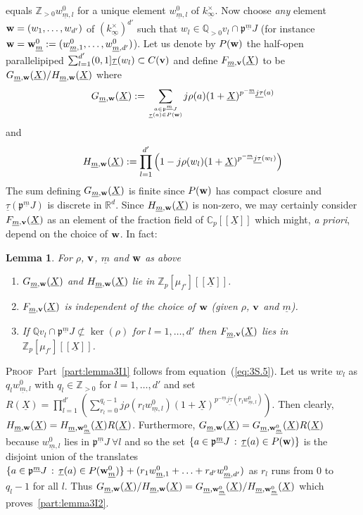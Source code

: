 \documentclass[12pt]{article}
\newtheorem{lemma}{Lemma}[section]
\newcounter{rem}[section]%
\newcommand{\bbC}{\ensuremath{\mathbb{C}}}
\newcommand{\bbQ}{\ensuremath{\mathbb{Q}}}
\newcommand{\bbR}{\ensuremath{\mathbb{R}}}
\newcommand{\bbZ}{\ensuremath{\mathbb{Z}}}
\newcommand{\bPf}{\noindent \textsc{Proof\ }}
\newcommand{\bv}{\ensuremath{{\bf v}}}
\newcommand{\bw}{\ensuremath{{\bf w}}}
\newcommand{\fp}{\ensuremath{\mathfrak{p}}}
\newcommand{\refeq}[1]{~(\ref{eq:#1})}
\newcommand{\rem}{\refstepcounter{rem}\noindent{\sc Remark \therem}}%
\renewcommand{\therem}{\thesection.\arabic{rem}}
\newcommand{\ktuinf}{\ensuremath{k^\times_{\uinf}}}
\newcommand{\uinf}{\ensuremath{{\underline{\infty}}}}
\newcommand{\ujct}{\ensuremath{\underline{j\tau}}}
\newcommand{\um}{\ensuremath{{\underline{m}}}}
\newcommand{\utau}{\ensuremath{{\underline{\tau}}}}
\newcommand{\uX}{\ensuremath{{\underline{X}}}}
\begin{document}
equals $\bbZ_{>0}w^0_{\um,l}$
for a unique element $w^0_{\um,l}$ of $\ktuinf$.
Now choose \emph{any} element $\bw=(w_1,\ldots,w_{d'})$ of
$(\ktuinf)^{d'}$ such that $w_l\in\bbQ_{>0} v_l\cap\fp^\um J$
(for instance $\bw=\bw^0_\um:=(w^0_{\um,1},\ldots,w^0_{\um,d'})$).
Let us denote by $P(\bw)$ the half-open parallelipiped
$\sum_{l=1}^{d'}(0,1]\utau(w_l)\subset C(\bv)$
and define $F_{\um,\bv}(\uX)$ to be $G_{\um,\bw}(\uX)/H_{\um,\bw}(\uX)$ where
\[
G_{\um,\bw}(\uX):=
{\displaystyle \sum_{a\in\fp^{\um} J\atop \utau(a)\in P(\bw)}}
j\rho(a)(1+\uX)^{p^{-\um}\ujct(a)}
\]
and
\[
H_{\um,\bw}(\uX):=
{\displaystyle \prod_{l=1}^{d'}}
\left(
1-j\rho(w_l)(1+\uX)^{p^{-\um}\ujct(w_l)}
\right)
\]
The sum defining $G_{\um,\bw}(\uX)$ is finite since
$P(\bw)$ has compact closure and
$\utau(\fp^{\um} J)$ is discrete in $\bbR^d$.
Since $H_{\um,\bw}(\uX)$ is non-zero, we may certainly consider $F_{\um,\bv}(\uX)$
as an element of the fraction field
of $\bbC_p[[\uX]]$ which might, \emph{a priori}, depend on the choice of $\bw$.
In fact:
\begin{lemma}\label{lemma:3I} For $\rho$, $\bv$, $\um$ and $\bw$ as above
\begin{enumerate}
\item\label{part:lemma3I1} $G_{\um,\bw}(\uX)$ and $H_{\um,\bw}(\uX)$
lie in $\bbZ_p[\mu_{f'}][[\uX]]$.
\item\label{part:lemma3I2} $F_{\um,\bv}(\uX)$ is independent of
the choice of $\bw$ (given $\rho$, $\bv$ and $\um$).
\item\label{part:lemma3I3} If $\bbQ v_l\cap \fp^\um J\not\subset\ker(\rho)$
for $l=1,\ldots,d'$ then $F_{\um,\bv}(\uX)$ lies in $\bbZ_p[\mu_{f'}][[\uX]]$.
\end{enumerate}
\end{lemma}
\bPf Part~\ref{part:lemma3I1} follows from equation\refeq{3S.5}.
Let us write $w_l$ as $q_lw^0_{\um,l}$ with $q_l\in \bbZ_{>0}$ for $l=1,\ldots,d'$
and set $R(\uX)=
\prod_{l=1}^{d'}
\left(\sum_{r_l=0}^{q_l-1}
j\rho(r_lw^0_{\um,l})(1+\uX)^{p^{-\um}\ujct(r_lw^0_{\um,l})}\right)$.
Then clearly, $H_{\um,\bw}(\uX)=H_{\um,\bw^0_{\um}}(\uX)R(\uX)$. Furthermore,
$G_{\um,\bw}(\uX)=G_{\um,\bw^0_{\um}}(\uX)R(\uX)$ because
$w^0_{\um,l}$ lies in $\fp^{\um} J\ \forall l$ and so the set
$\{a\in\fp^{\um} J\,:\,\utau(a)\in P(\bw)\}$
is the disjoint union of the translates
$\{a\in\fp^{\um} J\,:\,\utau(a)\in P(\bw^0_{\um})\}+
(r_1w^0_{\um,1}+\ldots+r_{d'}w^0_{\um,d'})$
as $r_l$ runs from $0$ to $q_l-1$ for all $l$.
Thus $G_{\um,\bw}(\uX)/H_{\um,\bw}(\uX)=G_{\um,\bw^0_{\um}}(\uX)/H_{\um,\bw^0_{\um}}(\uX)$
which proves~\ref{part:lemma3I2}.
\end{document}
